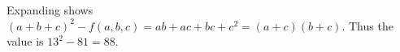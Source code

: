 Expanding shows $(a+b+c)^2-f(a,b,c)=ab+ac+bc+c^2=(a+c)(b+c)$. Thus the value is $13^2-81=\boxed{88}$.
